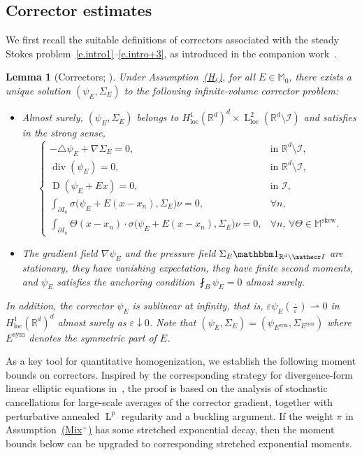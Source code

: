 \documentclass[JEP,XML,SOM,Unicode,published]{cedram}
\let\mathcal\mathscr
\newcommand{\Hd}{\hyperref[Hd]{\textup{(H$_\delta$)}}\xspace}
\newcommand{\Mix}{\hyperref[Mix+]{\textup{(Mix$^+$)}}\xspace}
\let\mathds\mathbbm
\theoremstyle{plain}
\newtheorem{lem1}[theor1]{Lemma}
\theoremstyle{definition}
\newcommand{\e}{\varepsilon}
\newcommand{\R}{\mathbb R}
\newcommand{\Ic}{\mathcal I}
\newcommand{\Md}{\mathbb M}
\newcommand{\cvf}{\rightharpoonup}
\newcommand{\loc}{{\operatorname{loc}}}
\newcommand{\D}{\operatorname{D}}
\newcommand{\Ld}{\operatorname{L}}
\newcommand{\Div}{{\operatorname{div}}}
\newcommand{\Sym}{{\operatorname{sym}}}
\newcommand{\Skew}{{\operatorname{skew}}}
\begin{document}
\subsection{Corrector estimates}

We first recall the suitable definitions of correctors associated with the steady Stokes problem~\eqref{e.intro1}--\eqref{e.intro+3}, as introduced in the companion work~\cite[Prop.\,2.1]{DG-19}.

\begin{lem1}[Correctors; \cite{DG-19}]\label{lem:cor}
Under Assumption~\Hd, for all $E\in\Md_0$, there exists a unique solution $(\psi_E,\Sigma_E)$ to the following infinite-volume corrector problem:
\begin{itemize}
\item Almost surely, $(\psi_E,\Sigma_E)$ belongs to $H^1_\loc(\R^d)^d\times\Ld^2_\loc(\R^d\setminus\Ic)$ and satisfies in the strong sense,
\begin{equation}\label{eq:corr-Stokes}
\begin{cases}
-\triangle\psi_E+\nabla\Sigma_E=0,&\text{in $\R^d\setminus\Ic$},\\
\Div(\psi_E)=0,&\text{in $\R^d\setminus\Ic$},\\
\D(\psi_E+Ex)=0,
&\text{in $\Ic$},\\
\int_{\partial I_n}\sigma\big(\psi_E+E(x-x_n),\Sigma_E\big)\nu=0,&\forall n,\\
\int_{\partial I_n}\Theta(x-x_n)\cdot\sigma\big(\psi_E+E(x-x_n),\Sigma_E\big)\nu=0,&\forall n,\,\forall\Theta\in\Md^\Skew.
\end{cases}
\end{equation}
\item The gradient field $\nabla\psi_E$ and the pressure field $\Sigma_E\mathds1_{\R^d\setminus\Ic}$ are stationary, they have vanishing expectation, they have finite second moments, and $\psi_E$ satisfies the anchoring condition $\fint_B \psi_E=0$ almost surely.
\end{itemize}
In addition, the corrector $\psi_E$ is sublinear at infinity, that is, $\e\psi_E(\frac\cdot\e)\cvf{}0$ in $H^1_\loc(\R^d)^d$ almost surely as $\e\downarrow0$. Note that $(\psi_E,\Sigma_E)=(\psi_{E^\Sym},\Sigma_{E^\Sym})$ where $E^\Sym$ denotes the symmetric part of $E$.
\end{lem1}

As a key tool for quantitative homogenization, we establish the following moment bounds on correctors.
Inspired by the corresponding strategy for divergence-form linear elliptic equations in~\cite{JO}, the proof is based on the analysis of stochastic cancellations for large-scale averages of the corrector gradient, together with perturbative annealed $\Ld^p$ regularity and a buckling argument.
If the weight $\pi$ in Assumption~\Mix has some stretched exponential decay, then the moment bounds below can be upgraded to corresponding stretched exponential moments.
\end{document}
